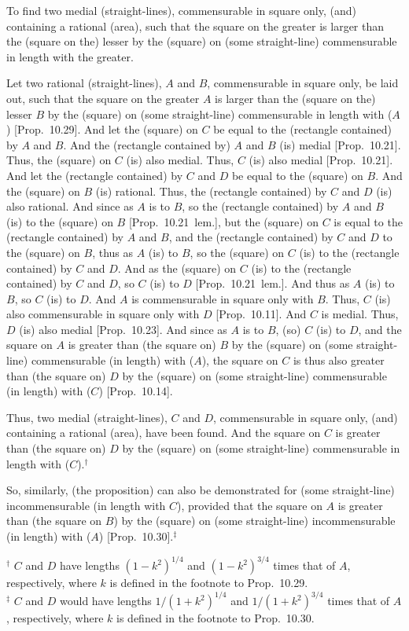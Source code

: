 \begin{Parallel}{}{}
{To find two medial (straight-lines),
commensurable in square only, (and) containing a rational (area), such that
the square on the greater is larger than the (square on the) lesser by the
(square) on (some straight-line) commensurable in length with the greater.

\epsfysize=1.6in
\centerline{}

Let two rational (straight-lines), $A$ and $B$, commensurable in square only, 
be laid out, such that the square on the greater $A$ is larger than the (square on
the) lesser $B$ by the (square) on (some straight-line) commensurable
in length with ($A$) [Prop.~10.29]. And let the
(square) on $C$ be equal to the (rectangle contained) by $A$ and $B$.
And the (rectangle contained by) $A$ and $B$ (is) medial [Prop.~10.21]. Thus, the (square) on $C$ (is)
also medial. Thus, $C$ (is) also medial [Prop.~10.21]. And let the (rectangle contained) by $C$ and $D$
be equal to the (square) on $B$. And the (square)
on $B$ (is) rational. Thus, the (rectangle contained) by $C$ and $D$ (is)
also rational. And since as $A$ is to $B$, so the (rectangle contained) by
$A$ and $B$ (is) to the (square) on $B$ [Prop.~10.21~lem.], but the (square) on $C$
is equal to the (rectangle contained) by $A$ and $B$,  
and the (rectangle contained) by $C$ and $D$ to the (square) on
$B$, thus as $A$ (is) to $B$,
so the (square) on $C$ (is) to the (rectangle contained) by $C$ and $D$.
And as the (square) on $C$ (is) to the (rectangle contained) by $C$ and $D$,
so $C$ (is) to $D$ [Prop.~10.21~lem.].
And thus as $A$ (is) to $B$, so $C$ (is) to $D$. And $A$ is commensurable
in square only with $B$. Thus, $C$ (is) also commensurable in square
only with $D$ [Prop.~10.11]. And $C$ is medial.
Thus, $D$ (is) also medial [Prop.~10.23]. 
And since as $A$ is to $B$, (so) $C$ (is) to $D$, and the square on $A$
is greater than (the square on) $B$ by the (square) on (some straight-line)
commensurable (in length) with ($A$), the square on $C$
is thus also greater than (the square on) $D$ by the (square) on (some straight-line)
commensurable (in length) with ($C$) [Prop.~10.14]. 

Thus, two medial (straight-lines), $C$ and $D$, 
commensurable in square only, (and) containing a rational (area), have been found. And the square on $C$ is greater than (the square on) $D$ by the
(square) on (some straight-line) commensurable in length with ($C$).$^\dag$

So, similarly, (the proposition) can also be demonstrated for  (some straight-line) incommensurable
(in length with $C$), provided that the square on $A$ is greater than (the square on $B$) by the (square) on (some straight-line) incommensurable (in length) with ($A$) [Prop.~10.30].$^\ddag$}
\end{Parallel}
{\footnotesize\noindent$^\dag$ $C$ and $D$ have lengths $(1-k^2)^{1/4}$ and $(1-k^2)^{3/4}$ times that of $A$, respectively, where $k$ is defined in the
footnote to Prop.~10.29.\\[0.5ex]
$^\ddag$ $C$ and $D$ would have lengths $1/(1+k^2)^{1/4}$ and $1/(1+k^2)^{3/4}$ times that of $A$, respectively, where $k$ is defined in the footnote to  Prop.~10.30.}

